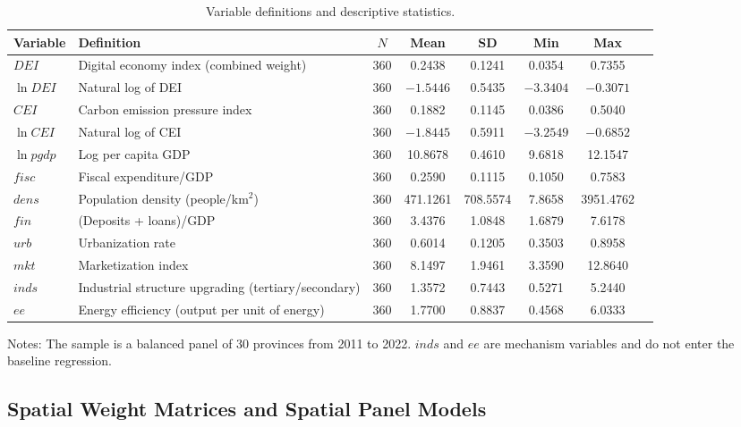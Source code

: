 \documentclass[economies,article,submit,moreauthors]{Definitions/mdpi}
\begin{document}
\begin{table}[!htbp]
\centering
\caption{Variable definitions and descriptive statistics.}
\label{tab:desc}
\footnotesize
\setlength{\tabcolsep}{2.5pt}
\begin{threeparttable}
\begin{tabular}{llcccccc}
\toprule
Variable & Definition & $N$ & Mean & SD & Min & Max\\
\midrule
$DEI$ & Digital economy index (combined weight) & 360 & 0.2438 & 0.1241 & 0.0354 & 0.7355\\
$\ln DEI$ & Natural log of DEI & 360 & $-1.5446$ & 0.5435 & $-3.3404$ & $-0.3071$\\
$CEI$ & Carbon emission pressure index & 360 & 0.1882 & 0.1145 & 0.0386 & 0.5040\\
$\ln CEI$ & Natural log of CEI & 360 & $-1.8445$ & 0.5911 & $-3.2549$ & $-0.6852$\\
$\ln pgdp$ & Log per capita GDP & 360 & 10.8678 & 0.4610 & 9.6818 & 12.1547\\
$fisc$ & Fiscal expenditure/GDP & 360 & 0.2590 & 0.1115 & 0.1050 & 0.7583\\
$dens$ & Population density (people/km$^2$) & 360 & 471.1261 & 708.5574 & 7.8658 & 3951.4762\\
$fin$ & (Deposits + loans)/GDP & 360 & 3.4376 & 1.0848 & 1.6879 & 7.6178\\
$urb$ & Urbanization rate & 360 & 0.6014 & 0.1205 & 0.3503 & 0.8958\\
$mkt$ & Marketization index & 360 & 8.1497 & 1.9461 & 3.3590 & 12.8640\\
$inds$ & Industrial structure upgrading (tertiary/secondary) & 360 & 1.3572 & 0.7443 & 0.5271 & 5.2440\\
$ee$ & Energy efficiency (output per unit of energy) & 360 & 1.7700 & 0.8837 & 0.4568 & 6.0333\\
\bottomrule
\end{tabular}
\begin{tablenotes}\footnotesize
\item Notes: The sample is a balanced panel of 30 provinces from 2011 to 2022. $inds$ and $ee$ are mechanism variables and do not enter the baseline regression.
\end{tablenotes}
\end{threeparttable}
\end{table}

\subsection{Spatial Weight Matrices and Spatial Panel Models}
\end{document}
